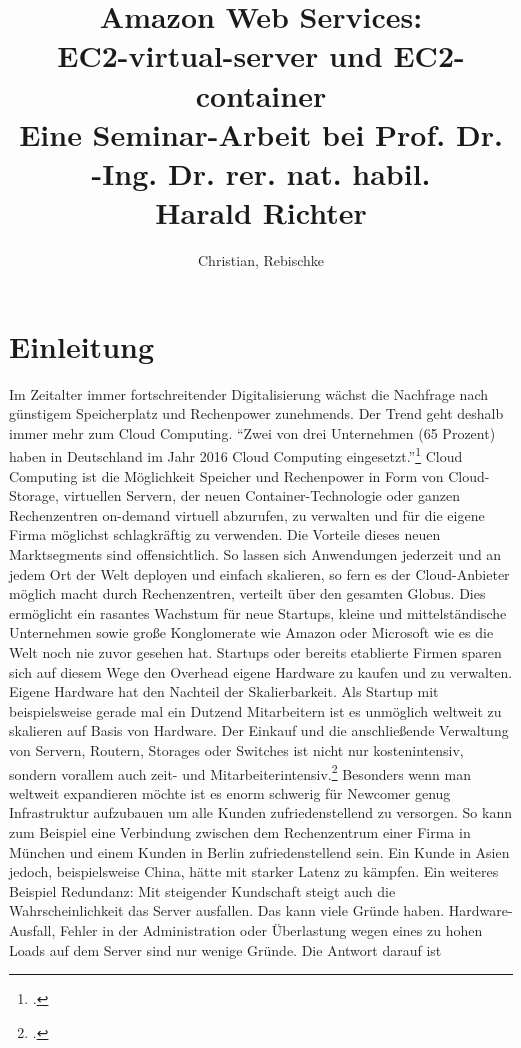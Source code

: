 \documentclass[titlepage]{report}
\title{Amazon Web Services:\\ EC2\hyp{}virtual\hyp{}server und EC2\hyp{}container \\
\small Eine Seminar\hyp{}Arbeit bei Prof. Dr. -Ing. Dr. rer. nat. habil. \\
Harald Richter}
\author{Christian, Rebischke}
\begin{document}
\maketitle
\tableofcontents
\chapter*{Einleitung}
Im Zeitalter immer fortschreitender Digitalisierung wächst die Nachfrage
nach günstigem Speicherplatz und Rechenpower zunehmends. Der Trend geht
deshalb immer mehr zum Cloud Computing.  ``Zwei von drei Unternehmen (65
Prozent) haben in Deutschland im Jahr 2016 Cloud Computing
eingesetzt.''\footcite{SWG17} Cloud Computing ist die Möglichkeit
Speicher und Rechenpower in Form von Cloud\hyp{}Storage, virtuellen Servern,
der neuen Container\hyp{}Technologie oder ganzen Rechenzentren on\hyp{}demand
virtuell abzurufen, zu verwalten und für die eigene Firma möglichst
schlagkräftig zu verwenden. Die Vorteile dieses neuen Marktsegments sind
offensichtlich. So lassen sich Anwendungen jederzeit und an jedem Ort
der Welt deployen und einfach skalieren, so fern es der Cloud\hyp{}Anbieter
möglich macht durch Rechenzentren, verteilt über den gesamten Globus.
Dies ermöglicht ein rasantes Wachstum für neue Startups, kleine und
mittelständische Unternehmen sowie große Konglomerate wie Amazon oder
Microsoft wie es die Welt noch nie zuvor gesehen hat. Startups oder
bereits etablierte Firmen sparen sich auf diesem Wege den Overhead
eigene Hardware zu kaufen und zu verwalten.  Eigene Hardware hat den
Nachteil der Skalierbarkeit. Als Startup mit beispielsweise gerade mal
ein Dutzend Mitarbeitern ist es unmöglich weltweit zu skalieren auf
Basis von Hardware. Der Einkauf und die anschließende Verwaltung von
Servern, Routern, Storages oder Switches ist nicht nur kostenintensiv,
sondern vorallem auch zeit\hyp{} und Mitarbeiterintensiv.\footcite[S.
1]{RZ17} Besonders wenn man weltweit expandieren möchte ist es enorm
schwerig für Newcomer genug Infrastruktur aufzubauen um alle Kunden
zufriedenstellend zu versorgen.  So kann zum Beispiel eine Verbindung
zwischen dem Rechenzentrum einer Firma in München und einem Kunden in
Berlin zufriedenstellend sein. Ein Kunde in Asien jedoch, beispielsweise
China, hätte mit starker Latenz zu kämpfen. Ein weiteres Beispiel
Redundanz: Mit steigender Kundschaft steigt auch die Wahrscheinlichkeit
das Server ausfallen. Das kann viele Gründe haben. Hardware\hyp{}Ausfall,
Fehler in der Administration oder Überlastung wegen eines zu hohen Loads
auf dem Server sind nur wenige Gründe. Die Antwort darauf ist
\end{document}
